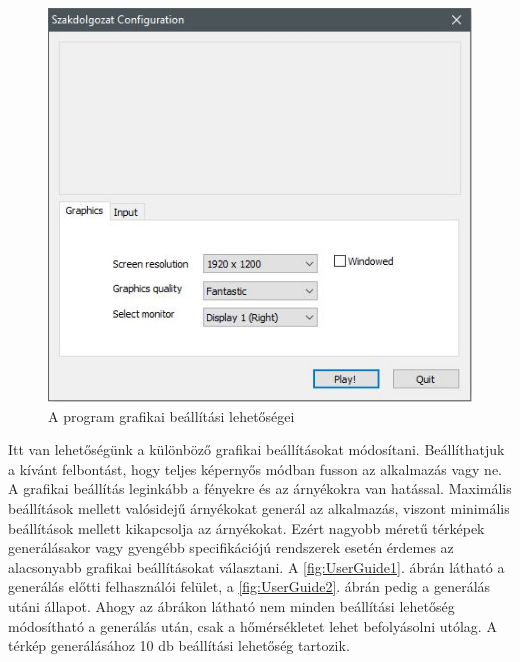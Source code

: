 \begin{figure}[h!]
\centering
\includegraphics[scale=0.6]{kepek/UnityStartUp.jpg}
\caption{A program grafikai beállítási lehetőségei}
\label{fig:UnityStartUp}
\end{figure}

\noindent Itt van lehetőségünk a különböző grafikai beállításokat módosítani. Beállíthatjuk a kívánt felbontást, hogy teljes képernyős módban fusson az alkalmazás vagy ne. A grafikai beállítás leginkább a fényekre és az árnyékokra van hatással. Maximális beállítások mellett valósidejű árnyékokat generál az alkalmazás, viszont minimális beállítások mellett kikapcsolja az árnyékokat. Ezért nagyobb méretű térképek generálásakor vagy gyengébb specifikációjú rendszerek esetén érdemes az alacsonyabb grafikai beállításokat választani.
\newline
\newline A \ref{fig:UserGuide1}. ábrán látható a generálás előtti felhasználói felület, a \ref{fig:UserGuide2}. ábrán pedig a generálás utáni állapot. Ahogy az ábrákon látható nem minden beállítási lehetőség módosítható a generálás után, csak a hőmérsékletet lehet befolyásolni utólag. A térkép generálásához 10 db beállítási lehetőség tartozik.

